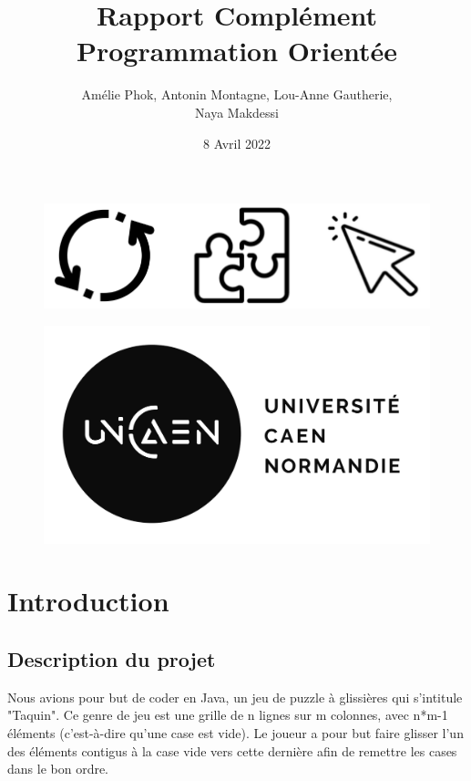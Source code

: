 \documentclass[french,12pt]{article}
\title{Rapport Complément Programmation Orientée}
\author{Amélie Phok, Antonin Montagne, Lou-Anne Gautherie, \\Naya Makdessi}
\date{8 Avril 2022}
\begin{document}
\maketitle

\begin{figure}[h]	
	\begin{center}
		\includegraphics[scale=0.4]{img/fond.png}	
	\end{center}
\end{figure}

\begin{figure}[b]
	\begin{center}
		\includegraphics[scale=0.7]{img/unicaen.png}	
	\end{center}
\end{figure}

\thispagestyle{empty}
\setcounter{page}{0}
\newpage

\tableofcontents
\newpage

\section{Introduction}

\subsection{Description du projet}

Nous avions pour but de coder en Java, un jeu de puzzle à glissières qui s'intitule "Taquin". Ce genre de jeu est une grille de n lignes sur m colonnes, avec n*m-1 éléments (c'est-à-dire qu'une case est vide). Le joueur a pour but faire glisser l'un des éléments contigus à la case vide vers cette dernière afin de remettre les cases dans le bon ordre.\\
\end{document}
